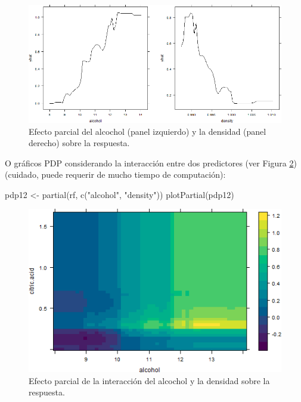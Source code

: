 \documentclass[
  spanish,
]{book}
\newenvironment{Shaded}{\begin{snugshade}}{\end{snugshade}}
\newcommand{\FunctionTok}[1]{\textcolor[rgb]{0.00,0.00,0.00}{#1}}
\newcommand{\NormalTok}[1]{#1}
\newcommand{\OtherTok}[1]{\textcolor[rgb]{0.56,0.35,0.01}{#1}}
\newcommand{\StringTok}[1]{\textcolor[rgb]{0.31,0.60,0.02}{#1}}
\theoremstyle{break}
\theoremstyle{definition}
\theoremstyle{definition}
\theoremstyle{definition}
\theoremstyle{definition}
\theoremstyle{remark}
\begin{document}
\begin{figure}[!htb]

{\centering \includegraphics[width=0.9\linewidth]{images/rf-pdp-uni-1} 

}

\caption{Efecto parcial del alcochol (panel izquierdo) y la densidad (panel derecho) sobre la respuesta.}\label{fig:rf-pdp-uni-plot}
\end{figure}

O gráficos PDP considerando la interacción entre dos predictores (ver Figura \ref{fig:rf-pdp-plot}) (cuidado, puede requerir de mucho tiempo de computación):

\begin{Shaded}
\begin{Highlighting}[]
\NormalTok{pdp12 }\OtherTok{\textless{}{-}} \FunctionTok{partial}\NormalTok{(rf, }\FunctionTok{c}\NormalTok{(}\StringTok{"alcohol"}\NormalTok{, }\StringTok{"density"}\NormalTok{))}
\FunctionTok{plotPartial}\NormalTok{(pdp12)}
\end{Highlighting}
\end{Shaded}

\begin{figure}[!htb]

{\centering \includegraphics[width=0.8\linewidth]{images/rf-pdp-1} 

}

\caption{Efecto parcial de la interacción del alcochol y la densidad sobre la respuesta.}\label{fig:rf-pdp-plot}
\end{figure}
\end{document}
